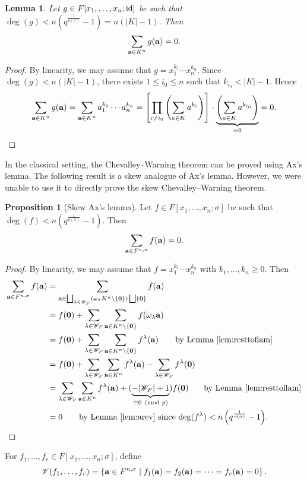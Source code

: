 \documentclass[11pt,reqno]{amsart}
\newtheorem{lem}[thm]{Lemma}
\theoremstyle{definition}
\newtheorem{prop}[thm]{Proposition}
\begin{document}
\begin{lem}\label{lem:arev}
Let $g \in F[x_1,\dots,x_n;{\rm id}]$ be such that $\deg(g) < n\left(q^{\frac{1}{o(\sigma)}}-1\right)=n(|K|-1)$. Then 
$$
\sum_{{\bf a} \in K^n}g({\bf a})=0.
$$
\end{lem}
\begin{proof}
By linearity, we may assume that $g=x_1^{k_1}\cdots x_n^{k_n}$. Since $\deg(g) < n\left(|K|-1\right)$, there exists $1 \leq i_0 \leq n$ such that $k_{i_0} < |K|-1$.  Hence
$$
\sum_{{\bf a} \in K^n}g({\bf a})=\sum_{{\bf a} \in K^n}a_1^{k_1}\cdots a_n^{k_n}=\left[\prod_{i\neq i_0}\left( \sum_{a \in K}a^{k_i} \right)\right] \cdot \underbrace{\left(\sum_{a \in K}a^{k_{i_0}}\right)}_{=0}=0.
$$
\end{proof}
In the classical setting, the Chevalley--Warning theorem can be proved using Ax's lemma. The following result is a skew analogue of Ax's lemma. However, we were unable to use it to directly prove the skew Chevalley--Warning theorem.
\begin{prop}[Skew Ax's lemma]\label{prop:axlemma}
Let $f \in F[x_1,\dots,x_n;\sigma]$ be such that $\deg(f)<n\left(q^{\frac{1}{o(\sigma)}}-1\right)$. Then
$$
\sum_{{\bf a} \in F^{n,\sigma}}f({\bf a})=0.
$$
\end{prop}
\begin{proof}
By linearity, we may assume that $f=x_1^{k_1}\cdots x_n^{k_n}$ with $k_1,\dots,k_n \geq 0$. Then 
\begin{align*}
\sum_{{\bf a} \in F^{n,\sigma}}f({\bf a})&=\sum_{{\bf a} \in \bigsqcup_{\lambda \in \mathscr{W}_F}\left(\omega_\lambda K^n \setminus \{{\bf 0}\}\right) \bigsqcup \{{\bf 0}\}}f({\bf a})\\
&=f({\bf 0})+\sum_{\lambda \in \mathscr{W}_F}\sum_{{\bf a} \in K^n \setminus \{{\bf 0}\}}f(\omega_\lambda {\bf a })\\
&=f({\bf 0})+\sum_{\lambda \in \mathscr{W}_F}\sum_{{\bf a} \in K^n \setminus \{{\bf 0}\}}f^\lambda({\bf a })\quad\quad \textrm{by Lemma \ref{lem:resttoflam}}\\
&=f({\bf 0})+\sum_{\lambda \in \mathscr{W}_F}\sum_{{\bf a} \in K^n}f^\lambda({\bf a})-\sum_{\lambda \in \mathscr{W}_F}f^\lambda({\bf 0})\\
&=\sum_{\lambda \in \mathscr{W}_F}\sum_{{\bf a} \in K^n}f^\lambda({\bf a})+(\underbrace{-|\mathscr{W}_F|+1}_{\equiv 0 \pmod{p}})f({\bf 0})\,\,\,\,\,\,\,\,\,\,\,\textrm{by Lemma \ref{lem:resttoflam}}\\
&=0 \quad \quad\textrm{by Lemma \ref{lem:arev} since $\deg(f^\lambda)<n\left(q^{\frac{1}{o(\sigma)}}-1\right)$}.
\end{align*}
\end{proof}
\noindent
For $f_1,\dots,f_r \in F[x_1,\dots,x_n;\sigma]$, define 
$$
\mathscr{V}(f_1,\dots,f_r)=\left\lbrace{\bf a} \in F^{n,\sigma} \mid f_1({\bf a})=f_2({\bf a})=\dots=f_r({\bf a})=0\right\rbrace.
$$
\end{document}
